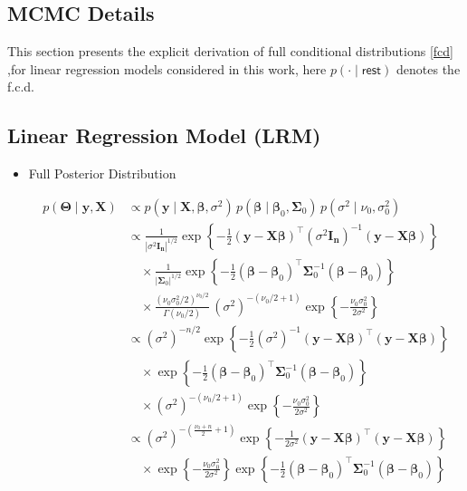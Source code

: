 \begin{appendix}
\chapter{MCMC Details}
\label{Appendix_B}

This section presents the explicit derivation of full conditional distributions \ref{fcd} ,for linear regression models considered in this work, here $p(\cdot\mid\textsf{rest})$ denotes the f.c.d.

\section{Linear Regression Model (LRM)}

\begin{itemize}
\item Full Posterior Distribution

\begin{equation}
\begin{split}
p(\bm{\Theta} \mid \bm{y}, \bm{X}) &\propto 
p(\bm{y} \mid \bm{X}, \bm{\beta}, \sigma^2) \,
p(\bm{\beta} \mid \bm{\beta}_0, \bm{\Sigma}_0) \,
p(\sigma^2 \mid \nu_0, \sigma_0^2) \\
&\propto \frac{1}{|\sigma^2 \bm{I_n}|^{1/2}}
\exp\left\{ -\frac{1}{2} (\bm{y} - \bm{X} \bm{\beta})^{\top}
(\sigma^2 \bm{I_n})^{-1} (\bm{y} - \bm{X} \bm{\beta}) \right\} \\
&\quad \times \frac{1}{|\bm{\Sigma}_0|^{1/2}} 
\exp\left\{ -\frac{1}{2} (\bm{\beta} - \bm{\beta}_0)^{\top}
\bm{\Sigma}_0^{-1} (\bm{\beta} - \bm{\beta}_0) \right\} \\
&\quad \times \frac{(\nu_0 \sigma_0^2 / 2)^{\nu_0 / 2}}{\Gamma(\nu_0 / 2)} \,
(\sigma^2)^{-(\nu_0/2 + 1)} 
\exp\left\{ -\frac{\nu_0 \sigma_0^2}{2\sigma^2} \right\} \\
&\propto (\sigma^2)^{-n/2} 
\exp\left\{ -\frac{1}{2} (\sigma^2)^{-1} (\bm{y} - \bm{X} \bm{\beta})^{\top}
(\bm{y} - \bm{X} \bm{\beta}) \right\} \\
&\quad \times \exp\left\{ -\frac{1}{2} (\bm{\beta} - \bm{\beta}_0)^{\top}
\bm{\Sigma}_0^{-1} (\bm{\beta} - \bm{\beta}_0) \right\} \\
&\quad \times (\sigma^2)^{-(\nu_0/2 + 1)} 
\exp\left\{ -\frac{\nu_0 \sigma_0^2}{2\sigma^2} \right\} \\
&\propto (\sigma^2)^{-\left( \frac{\nu_0 + n}{2} + 1 \right)}
\exp\left\{ -\frac{1}{2\sigma^2} (\bm{y} - \bm{X} \bm{\beta})^{\top}
(\bm{y} - \bm{X} \bm{\beta}) \right\} \\
&\quad \times \exp\left\{ -\frac{\nu_0 \sigma_0^2}{2\sigma^2} \right\}
\exp\left\{ -\frac{1}{2} (\bm{\beta} - \bm{\beta}_0)^{\top}
\bm{\Sigma}_0^{-1} (\bm{\beta} - \bm{\beta}_0) \right\}
\end{split}
\end{equation}


\end{itemize}
\end{appendix}
